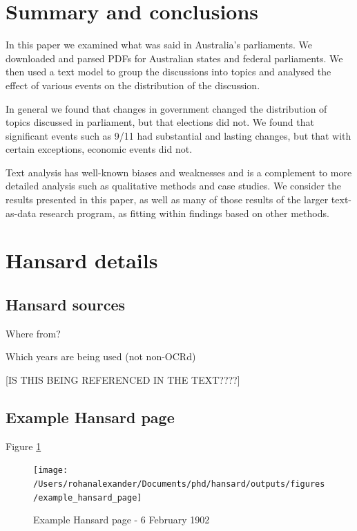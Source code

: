 \documentclass[12pt,]{article}
\theoremstyle{definition}
\theoremstyle{definition}
\theoremstyle{definition}
\theoremstyle{remark}
\begin{document}
\section{Summary and conclusions}\label{summary-and-conclusions}

In this paper we examined what was said in Australia's parliaments. We
downloaded and parsed PDFs for Australian states and federal
parliaments. We then used a text model to group the discussions into
topics and analysed the effect of various events on the distribution of
the discussion.

In general we found that changes in government changed the distribution
of topics discussed in parliament, but that elections did not. We found
that significant events such as 9/11 had substantial and lasting
changes, but that with certain exceptions, economic events did not.

Text analysis has well-known biases and weaknesses and is a complement
to more detailed analysis such as qualitative methods and case studies.
We consider the results presented in this paper, as well as many of
those results of the larger text-as-data research program, as fitting
within findings based on other methods.

\newpage

\appendix


\section{Hansard details}\label{hansard-details}

\subsection{Hansard sources}\label{hansardsources}

Where from?

Which years are being used (not non-OCRd)

{[}IS THIS BEING REFERENCED IN THE TEXT????{]}

\subsection{Example Hansard page}\label{examplehansardpage}

Figure \ref{fig:asdf}

\begin{figure}
\texttt{[image: /Users/rohanalexander/Documents/phd/hansard/outputs/figures/example\_hansard\_page]} \caption{Example Hansard page - 6 February 1902}\label{fig:asdf}
\end{figure}
\end{document}
